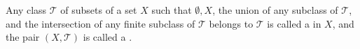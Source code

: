 Any class $\mathcal{T}$ of subsets of a set $X$ such that $\emptyset, X$, the union of any subclass of $\mathcal{T}$, and the intersection of any finite subclass of $\mathcal{T}$ belongs to $\mathcal{T}$ is called a  in $X$, and the pair $(X, \mathcal{T})$ is called a .
